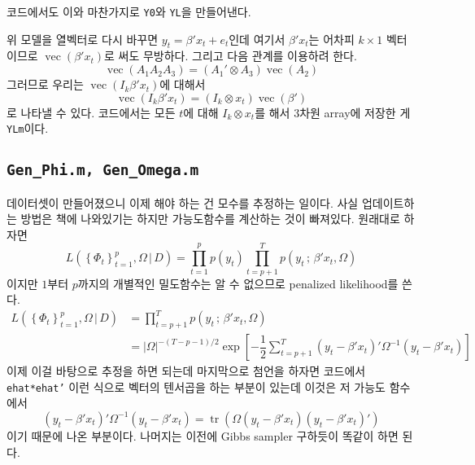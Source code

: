 \documentclass{article}
\DeclareMathOperator{\tr}{tr}
\DeclareMathOperator{\ve}{vec}
\begin{document}
  코드에서도 이와 마찬가지로 \texttt{Y0}와 \texttt{YL}을 만들어낸다.\par
  위 모델을 열벡터로 다시 바꾸면 $y_{t}=\beta'x_{t}+e_{t}$인데 여기서 $\beta' x_{t}$는 어차피 $k\times 1$ 벡터이므로 $\ve (\beta' x_{t})$로 써도 무방하다. 그리고 다음 관계를 이용하려 한다.
  \begin{equation}
    \ve (A_{1}A_{2}A_{3}) = \left(A_{1}'\otimes A_{3}\right)\ve \left(A_{2}\right)
  \end{equation}
  그러므로 우리는 $\ve \left(I_{k}\beta' x_{t}\right)$에 대해서
  \begin{equation}
    \ve \left(I_{k}\beta' x_{t}\right) = \left(I_{k}\otimes x_{t}\right)\ve \left(\beta'\right)
  \end{equation}
  로 나타낼 수 있다. 코드에서는 모든 $t$에 대해 $I_{k}\otimes x_{t}$를 해서 3차원 array에 저장한 게 \texttt{YLm}이다. \par
\subsection{\texttt{Gen\_Phi.m, Gen\_Omega.m}}
  데이터셋이 만들어졌으니 이제 해야 하는 건 모수를 추정하는 일이다. 사실 업데이트하는 방법은 책에 나와있기는 하지만 가능도함수를 계산하는 것이 빠져있다. 원래대로 하자면
  \begin{equation}
    L\left(\left\{\Phi_{t}\right\}_{t=1}^{p},\Omega\,|\,D \right) = \prod_{t=1}^{p}p\left(y_{t}\right)\prod_{t=p+1}^{T}p\left(y_{t}\,;\,\beta' x_{t},\Omega\right)
  \end{equation}
  이지만 $1$부터 $p$까지의 개별적인 밀도함수는 알 수 없으므로 penalized likelihood를 쓴다.
  \begin{align}
    L\left(\left\{\Phi_{t}\right\}_{t=1}^{p},\Omega\,|\,D \right) &= \prod_{t=p+1}^{T}p\left(y_{t}\,;\, \beta'x_{t},\Omega\right)\\
    &= |\Omega|^{-(T-p-1)/2}\exp\left[-\dfrac{1}{2}\sum_{t=p+1}^{T}\left(y_{t}-\beta' x_{t}\right)'\Omega^{-1}\left(y_{t}-\beta' x_{t}\right) \right]
  \end{align}
  이제 이걸 바탕으로 추정을 하면 되는데 마지막으로 첨언을 하자면 코드에서 \texttt{ehat*ehat'} 이런 식으로 벡터의 텐서곱을 하는 부분이 있는데 이것은 저 가능도 함수에서
  \begin{equation}
    \left(y_{t}-\beta' x_{t}\right)'\Omega^{-1}\left(y_{t}-\beta' x_{t}\right) = \tr\left(\Omega\left(y_{t}-\beta' x_{t}\right)\left(y_{t}-\beta' x_{t}\right)'\right)
  \end{equation}
  이기 때문에 나온 부분이다. 나머지는 이전에 Gibbs sampler 구하듯이 똑같이 하면 된다.
\end{document}
